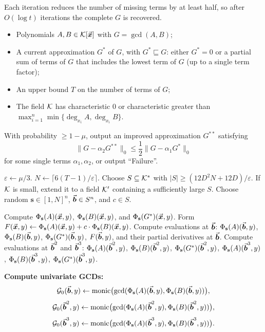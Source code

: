 \documentclass{article}
\numberwithin{equation}{section}
\begin{document}
Each iteration reduces the number of missing terms by at least half, so after $O(\log t)$ iterations the complete $G$ is recovered.



\begin{algorithm}
\caption{One-Step Improvement of Approximation}
\label{alg:one-step}
\begin{algorithmic}[1]
\Require
    \begin{itemize}
        \item Polynomials $A, B \in {\mathcal{K}}[\vec{\boldsymbol{x}}]$ with $G = \gcd(A,B)$;
        \item A current approximation $G^*$ of $G$, with $G^* \sqsubseteq G$: either $G^* = 0$ or a partial sum of terms of $G$ that includes the lowest term of $G$ (up to a single term factor);
        \item An upper bound $T$ on the number of terms of $G$;
        \item The field ${\mathcal{K}}$ has characteristic $0$ or characteristic greater than $\max_{i=1}^n\min\{\deg_{x_i} A,\deg_{x_i} B\}$.
    \end{itemize}
\Ensure
    With probability $\ge 1-\mu$, output an improved approximation $G^{**}$ satisfying
    \[
    \|G - \alpha_2 G^{**}\|_0 \le \frac{1}{2} \|G - \alpha_1 G^*\|_0
    \]
    for some single terms $\alpha_1, \alpha_2$, or output ``Failure''.

\State $\varepsilon \gets \mu/3$.
\State $N \gets \lceil 6(T-1)/\varepsilon \rceil$.
\State Choose $S \subseteq {\mathcal{K}}^*$ with $|S| \ge (12D^2 N + 12D)/\varepsilon$. If ${\mathcal{K}}$ is small, extend it to a field ${\mathcal{K}}'$ containing a sufficiently large $S$.
\State Choose random $\mathbf{s} \in [1,N]^n$, $\vec{\boldsymbol{b}} \in S^n$, and $c \in S$.

\State Compute $\Phi_{\mathbf{s}}(A)(\vec{\boldsymbol{x}},y)$, $\Phi_{\mathbf{s}}(B)(\vec{\boldsymbol{x}},y)$, and $\Phi_{\mathbf{s}}(G^*)(\vec{\boldsymbol{x}},y)$.
\State Form $F(\vec{\boldsymbol{x}},y) \gets \Phi_{\mathbf{s}}(A)(\vec{\boldsymbol{x}},y) + c \cdot \Phi_{\mathbf{s}}(B)(\vec{\boldsymbol{x}},y)$.
\State Compute evaluations at $\vec{\boldsymbol{b}}$: $\Phi_{\mathbf{s}}(A)(\vec{\boldsymbol{b}},y)$, $\Phi_{\mathbf{s}}(B)(\vec{\boldsymbol{b}},y)$, $\Phi_{\mathbf{s}}(G^*)(\vec{\boldsymbol{b}},y)$, $F(\vec{\boldsymbol{b}},y)$, and their partial derivatives at $\vec{\boldsymbol{b}}$.
\State Compute evaluations at $\vec{\boldsymbol{b}}^2$ and $\vec{\boldsymbol{b}}^3$: $\Phi_{\mathbf{s}}(A)(\vec{\boldsymbol{b}}^2,y)$, $\Phi_{\mathbf{s}}(B)(\vec{\boldsymbol{b}}^2,y)$, $\Phi_{\mathbf{s}}(G^*)(\vec{\boldsymbol{b}}^2,y)$, $\Phi_{\mathbf{s}}(A)(\vec{\boldsymbol{b}}^3,y)$, $\Phi_{\mathbf{s}}(B)(\vec{\boldsymbol{b}}^3,y)$, $\Phi_{\mathbf{s}}(G^*)(\vec{\boldsymbol{b}}^3,y)$.

\State \textbf{Compute univariate GCDs:}
\[
\mathcal{G}_0(\vec{\boldsymbol{b}},y) \gets \operatorname{monic}\bigl( \gcd( \Phi_{\mathbf{s}}(A)(\vec{\boldsymbol{b}},y), \Phi_{\mathbf{s}}(B)(\vec{\boldsymbol{b}},y) ) \bigr),
\]
\[
\mathcal{G}_0(\vec{\boldsymbol{b}}^2,y) \gets \operatorname{monic}\bigl( \gcd( \Phi_{\mathbf{s}}(A)(\vec{\boldsymbol{b}}^2,y), \Phi_{\mathbf{s}}(B)(\vec{\boldsymbol{b}}^2,y) ) \bigr),
\]
\[
\mathcal{G}_0(\vec{\boldsymbol{b}}^3,y) \gets \operatorname{monic}\bigl( \gcd( \Phi_{\mathbf{s}}(A)(\vec{\boldsymbol{b}}^3,y), \Phi_{\mathbf{s}}(B)(\vec{\boldsymbol{b}}^3,y) ) \bigr).
\]


\end{algorithmic}
\end{algorithm}
\end{document}
